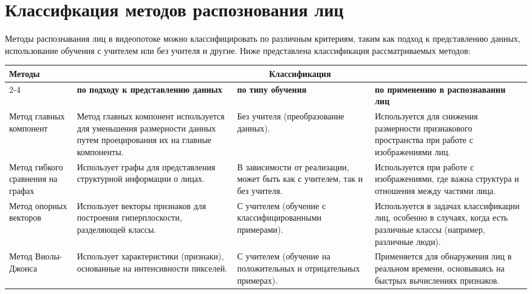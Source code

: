 \chapter{Классифкация методов распознования лиц}

Методы распознавания лиц в видеопотоке можно классифицировать по различным критериям, таким как подход к представлению данных, использование обучения с учителем или без учителя и другие. Ниже представлена классификация рассматриваемых методов:

\begin{table}[h]
    \centering
    \small
    \begin{tabular}{|p{3cm}|p{4.5cm}|p{4cm}|p{4cm}|}
        \hline
        \multirow{4}{*}{\textbf{Методы}} & \multicolumn{3}{c|}{\textbf{Классификация}} \\
        \cline{2-4}
        & \textbf{по подходу к представлению данных} & \textbf{по типу обучения} & \textbf{по применению в распознавании лиц} \\
        \hline
        Метод главных компонент & Метод главных компонент используется для уменьшения размерности данных путем проецирования их на главные компоненты. & Без учителя (преобразование данных). & Используется для снижения размерности признакового пространства при работе с изображениями лиц. \\
        \hline
        Метод гибкого сравнения на графах & Использует графы для представления структурной информации о лицах. & В зависимости от реализации, может быть как с учителем, так и без учителя. & Используется при работе с изображениями, где важна структура и отношения между частями лица. \\
        \hline
        Метод опорных векторов & Использует векторы признаков для построения гиперплоскости, разделяющей классы. & С учителем (обучение с классифицированными примерами). & Используется в задачах классификации лиц, особенно в случаях, когда есть различные классы (например, различные люди). \\
        \hline
        Метод Виолы-Джонса & Использует характеристики (признаки), основанные на интенсивности пикселей. & С учителем (обучение на положительных и отрицательных примерах). & Применяется для обнаружения лиц в реальном времени, основываясь на быстрых вычислениях признаков. \\
        \hline
    \end{tabular}
\end{table}